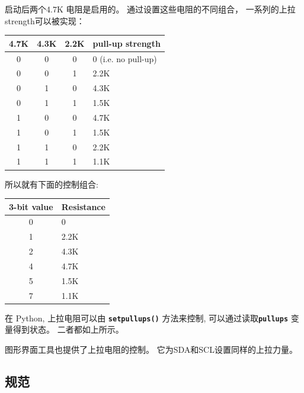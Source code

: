 \documentclass{article}
\newcommand{\mach}[1]{\texttt{\textbf{#1}}}
\newcommand{\gap}{\vspace{10pt}}
\begin{document}
启动后两个4.7K 电阻是启用的。 
通过设置这些电阻的不同组合， 一系列的上拉strength可以被实现： 


\begin{center}\begin{tabular}{cccl}
\hline
4.7K & 4.3K & 2.2K & pull-up strength \\
\hline
 0   &  0   &   0  & 0 (i.e. no pull-up) \\
 0   &  0   &   1  & 2.2K \\
 0   &  1   &   0  & 4.3K \\
 0   &  1   &   1  & 1.5K \\
 1   &  0   &   0  & 4.7K \\
 1   &  0   &   1  & 1.5K \\
 1   &  1   &   0  & 2.2K \\
 1   &  1   &   1  & 1.1K \\
\hline
\end{tabular}\end{center}\gap


所以就有下面的控制组合:

\begin{center}\begin{tabular}{cl}
\hline
3-bit value & Resistance \\
\hline
  0         & 0 \\
  1         & 2.2K \\
  2         & 4.3K \\
  4         & 4.7K \\
  5         & 1.5K \\
  7         & 1.1K \\
\hline
\end{tabular}\end{center}\gap

在 Python, 上拉电阻可以由 \mach{setpullups()} 方法来控制, 可以通过读取\mach{pullups} 变量得到状态。 
二者都如上所示。 

图形界面工具也提供了上拉电阻的控制。 它为SDA和SCL设置同样的上拉力量。 


\newpage
\subsection{规范}\label{electrical-characteristics}
\end{document}
